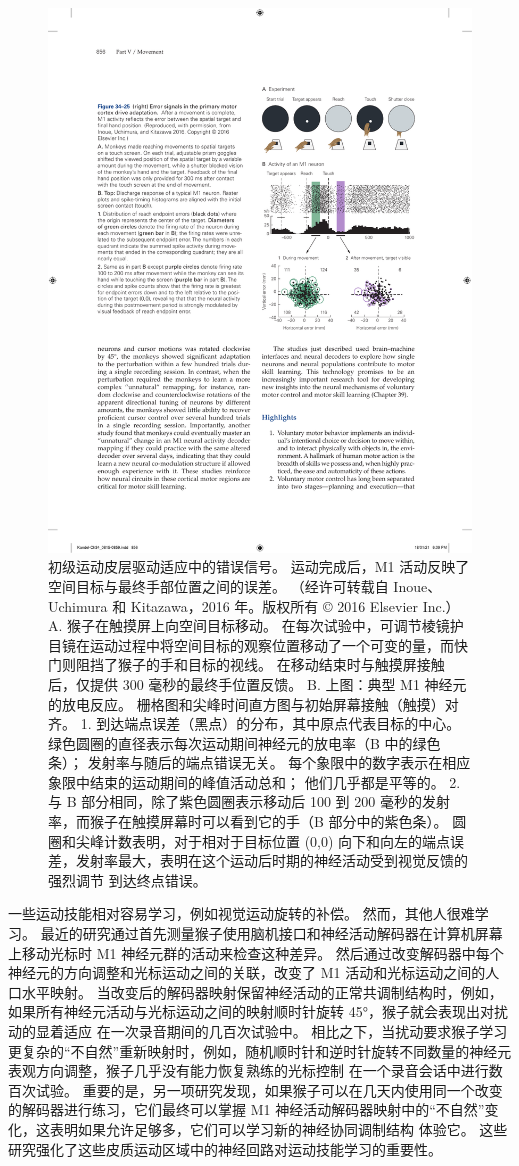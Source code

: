 \begin{figure}[htbp]
	\centering
	\includegraphics[width=0.5\linewidth]{chap34/fig_34_25}
	\caption{初级运动皮层驱动适应中的错误信号。 运动完成后，M1 活动反映了空间目标与最终手部位置之间的误差。 （经许可转载自 Inoue、Uchimura 和 Kitazawa，2016 年。版权所有 © 2016 Elsevier Inc.）A. 猴子在触摸屏上向空间目标移动。 在每次试验中，可调节棱镜护目镜在运动过程中将空间目标的观察位置移动了一个可变的量，而快门则阻挡了猴子的手和目标的视线。 在移动结束时与触摸屏接触后，仅提供 300 毫秒的最终手位置反馈。 B. 上图：典型 M1 神经元的放电反应。 栅格图和尖峰时间直方图与初始屏幕接触（触摸）对齐。 1. 到达端点误差（黑点）的分布，其中原点代表目标的中心。 绿色圆圈的直径表示每次运动期间神经元的放电率（B 中的绿色条）； 发射率与随后的端点错误无关。 每个象限中的数字表示在相应象限中结束的运动期间的峰值活动总和； 他们几乎都是平等的。 2. 与 B 部分相同，除了紫色圆圈表示移动后 100 到 200 毫秒的发射率，而猴子在触摸屏幕时可以看到它的手（B 部分中的紫色条）。 圆圈和尖峰计数表明，对于相对于目标位置 (0,0) 向下和向左的端点误差，发射率最大，表明在这个运动后时期的神经活动受到视觉反馈的强烈调节 到达终点错误。}
	\label{fig:34_25}
\end{figure}

一些运动技能相对容易学习，例如视觉运动旋转的补偿。 然而，其他人很难学习。 最近的研究通过首先测量猴子使用脑机接口和神经活动解码器在计算机屏幕上移动光标时 M1 神经元群的活动来检查这种差异。 然后通过改变解码器中每个神经元的方向调整和光标运动之间的关联，改变了 M1 活动和光标运动之间的人口水平映射。 当改变后的解码器映射保留神经活动的正常共调制结构时，例如，如果所有神经元活动与光标运动之间的映射顺时针旋转 45°，猴子就会表现出对扰动的显着适应 在一次录音期间的几百次试验中。 相比之下，当扰动要求猴子学习更复杂的“不自然”重新映射时，例如，随机顺时针和逆时针旋转不同数量的神经元表观方向调整，猴子几乎没有能力恢复熟练的光标控制 在一个录音会话中进行数百次试验。 重要的是，另一项研究发现，如果猴子可以在几天内使用同一个改变的解码器进行练习，它们最终可以掌握 M1 神经活动解码器映射中的“不自然”变化，这表明如果允许足够多，它们可以学习新的神经协同调制结构 体验它。 这些研究强化了这些皮质运动区域中的神经回路对运动技能学习的重要性。

